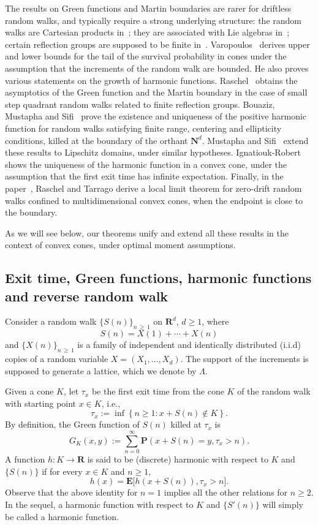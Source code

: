 \documentclass[10pt]{amsart}
\theoremstyle{definition}\newtheorem{defi}[theo]{Definition}\newtheorem{rema}[theo]{Remark}\newtheorem{exam}[theo]{Example}\newtheorem{exem}[theo]{Example}\newtheorem{nota}[theo]{Notation}
\newcommand{\pr}{\mathbf{P}}
\newcommand{\e}{\mathbf{E}}
\newcommand{\bfR}{\mathbf{R}}
\newcommand{\bfN}{\mathbf{N}}
\renewcommand{\geq}{\geqslant}
\begin{document}
The results on Green functions and Martin boundaries are rarer for driftless random walks, and typically require a strong underlying structure: the random walks are Cartesian products in~\cite{PiWo-92}; they are associated with Lie algebras in~\cite{Bi-91,Bi-92}; certain reflection groups are supposed to be finite in~\cite{BiBoOC-05}. Varopoulos~\cite{Va-99,Va-09} derives upper and lower bounds for the tail of the survival probability in cones under the assumption that the increments of the random walk are bounded. He also proves various statements on the growth of harmonic functions. Raschel~\cite{Ra-11,Ra-14} obtains the asymptotics of the Green function and the Martin boundary in the case of small step quadrant random walks related to finite reflection groups. Bouaziz, Mustapha and Sifi~\cite{BoMuSi-15} prove the existence and uniqueness of the positive harmonic function for random walks satisfying finite range, centering and ellipticity conditions, killed at the boundary of the orthant $\bfN^d$. Mustapha and Sifi~\cite{MuSi-19} extend these results to Lipschitz domains, under similar hypotheses. Ignatiouk-Robert~\cite{IR-21} shows the uniqueness of the harmonic function in a convex cone, under the assumption that the first exit time has infinite expectation. Finally, in the paper~\cite{RaTa-20}, Raschel and Tarrago derive a local limit theorem for zero-drift random walks confined to multidimensional convex cones, when the endpoint is close to the boundary.

As we will see below, our theorems unify and extend all these results in the context of convex cones, under optimal moment assumptions.


\subsection*{Exit time, Green functions, harmonic functions and reverse random walk}
Consider a random walk $\{S(n)\}_{n\,\geq\,1}$ on $\bfR^d$, $d\geq1$, where
\[
S(n) = X(1)+\cdots +X(n)
\]
and $\{X(n)\}_{n\,\geq\,1}$ is a family of independent and identically distributed (i.i.d) copies of a random variable $X=(X_1,\ldots,X_d)$. The support of the increments is supposed to generate a lattice, which we denote by $\Lambda$.

Given a cone $K$, let $\tau_x$ be the first exit time from the cone $K$ of the random walk with starting point $x\in K$, i.e.,
\begin{equation}\label{eq:exit_time_def}
\tau_x:=\inf\left\{n\geq 1 : x+S(n)\notin K\right\}.
\end{equation}
By definition, the Green function of $S(n)$ killed at $\tau_x$ is
\begin{equation}\label{eq:Green_function_def}
G_K(x,y) := \sum_{n=0}^\infty \pr(x+S(n)=y,\tau_x>n).
\end{equation}
A function $h:{K}\to \bfR$ is said to be (discrete) harmonic with respect to ${K}$ and $\{S(n)\}$ if for every $x\in{K}$ and $n\geq 1$,
\[
h(x)=\e\big[h(x+S(n)),\tau_{x}>n\big].
\]
Observe that the above identity for $n=1$ implies all the other relations for $n\geq 2$. In the sequel, a harmonic function with respect to ${K}$ and $\{S'(n)\}$ will simply be called a harmonic function.
\end{document}
